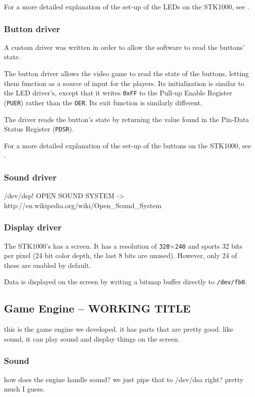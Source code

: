 		For a more detailed explanation of the set-up of the LEDs on the STK1000, see \cite{tdt4258-1}.
	\subsubsection{Button driver}
		A custom driver was written in order to allow the software to read the buttons' state.

		The button driver allows the video game to read the state of the buttons, letting them function as a source of input for the players.
		Its initialization is similar to the LED driver's, except that it writes \texttt{0xFF} to the Pull-up Enable Register (\texttt{PUER}) rather than the \texttt{OER}.
		Its exit function is similarly different.

		The driver reads the button's state by returning the value found in the Pin-Data Status Register (\texttt{PDSR}).


		For a more detailed explanation of the set-up of the buttons on the STK1000, see \cite{tdt4258-1}.	
	\subsubsection{Sound driver}
		/dev/dsp!
		OPEN SOUND SYSTEM -> http://en.wikipedia.org/wiki/Open_Sound_System
	\subsubsection{Display driver}
		The STK1000's has a screen.
		It has a resolution of \texttt{320}$\times$\texttt{240} and sports 32 bits per pixel (24 bit color depth, the last 8 bits are unused)\cite{lab-compendium}.
		However, only 24 of these are enabled by default\cite{avr32-disp}.

		Data is displayed on the screen by writing a bitmap buffer directly to \texttt{/dev/fb0}.


\subsection{Game Engine -- WORKING TITLE}
	this is the game engine we developed. it has parts that are pretty good. like sound, it can play sound and display things on the screen.
	\subsubsection{Sound}
		how does the engine handle sound?
		we just pipe that to /dev/dsa right?
		pretty much I guess.
